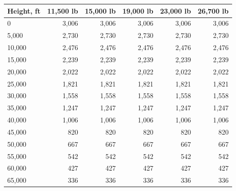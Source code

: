 \begin{tabular}{@{}lrrrrr@{}}
\toprule
Height, ft & 11,500 lb & 15,000 lb & 19,000 lb & 23,000 lb & 26,700 lb \\
\midrule
0 & 3,006 & 3,006 & 3,006 & 3,006 & 3,006 \\
5,000 & 2,730 & 2,730 & 2,730 & 2,730 & 2,730 \\
10,000 & 2,476 & 2,476 & 2,476 & 2,476 & 2,476 \\
15,000 & 2,239 & 2,239 & 2,239 & 2,239 & 2,239 \\
20,000 & 2,022 & 2,022 & 2,022 & 2,022 & 2,022 \\
25,000 & 1,821 & 1,821 & 1,821 & 1,821 & 1,821 \\
30,000 & 1,558 & 1,558 & 1,558 & 1,558 & 1,558 \\
35,000 & 1,247 & 1,247 & 1,247 & 1,247 & 1,247 \\
40,000 & 1,006 & 1,006 & 1,006 & 1,006 & 1,006 \\
45,000 & 820 & 820 & 820 & 820 & 820 \\
50,000 & 667 & 667 & 667 & 667 & 667 \\
55,000 & 542 & 542 & 542 & 542 & 542 \\
60,000 & 427 & 427 & 427 & 427 & 427 \\
65,000 & 336 & 336 & 336 & 336 & 336 \\
\bottomrule
\end{tabular}
